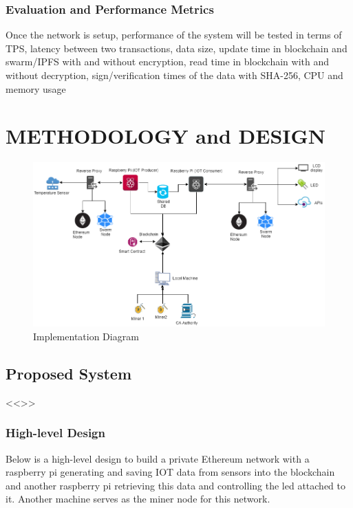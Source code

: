 \documentclass[11pt,openright]{report}
\begin{document}
\subsection{Evaluation and Performance Metrics}
Once the network is setup, performance of the system will be tested in terms of TPS, latency between two transactions, data size, update time in blockchain and swarm/IPFS with and without encryption, read time in blockchain with and without decryption, sign/verification times of the data with SHA-256, CPU and memory usage

\chapter{METHODOLOGY and DESIGN} \label{chapter:proposed_system}
\begin{figure}
	\centering
	\includegraphics[scale=0.7]{images/Final_Implementation.png}
	\caption{Implementation Diagram}
	\label{fig:impldiagram_architechture}
\end{figure}
\section{Proposed System}
<<>>

\subsection{High-level Design} \label{ss:construct_architecture}
Below is a high-level design to build a private Ethereum network with a raspberry pi generating and saving IOT data from sensors into the blockchain and another raspberry pi retrieving this data and controlling the led attached to it. Another machine serves as the miner node for this network.
\end{document}
